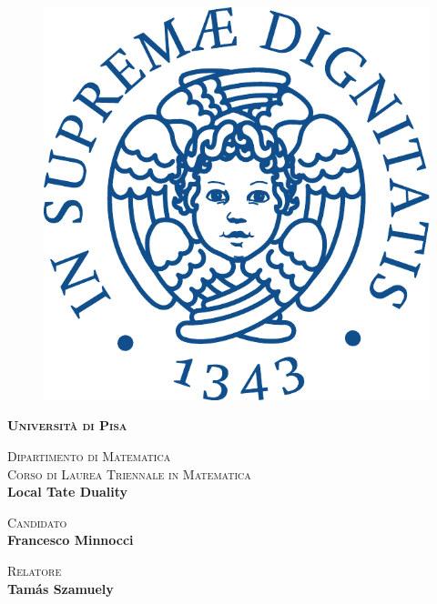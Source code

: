 \documentclass[a4paper, oneside]{memoir}
\begin{document}
\begin{titlingpage}

	\begin{figure}[!htb]
		\centering
		\includegraphics[scale=0.4]{cherubino.pdf}
	\end{figure}

	\begin{center}
		\textcolor[RGB]{2,87,144}{\textbf{\textsc{\huge Università di Pisa}}}\\
		\vspace{10mm}

		\large{\textsc{Dipartimento di Matematica}}\\
		\large{\textsc{Corso di Laurea Triennale in Matematica}}\\
		\vspace{35mm}
		{\Huge{\bfseries Local Tate Duality}}
	\end{center}
	\vspace{45mm}

	\begin{minipage}[t]{.5\textwidth}
		{\large{\scshape Candidato}{\normalsize\vspace{3mm}
				\bfseries\\ \large{Francesco Minnocci}}}
	\end{minipage}
	\hfill
	\begin{minipage}[t]{.5\textwidth}\raggedleft
		{\large{\scshape Relatore}{\normalsize\vspace{3mm} \bfseries\\ \large{Tamás Szamuely}}}
	\end{minipage}

	\vspace{30mm}

\end{titlingpage}
\end{document}
